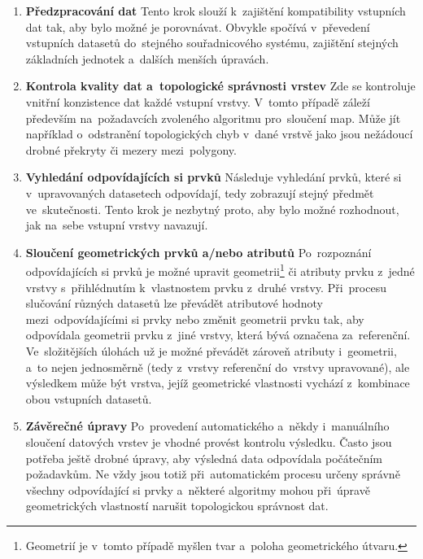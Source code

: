 \begin{enumerate}
  \item \textbf{Předzpracování dat}
    \subitem Tento krok slouží k~zajištění kompatibility vstupních dat tak, 
      aby bylo možné je porovnávat. Obvykle spočívá v~převedení vstupních 
      datasetů do~stejného souřadnico\-vé\-ho systému, zajištění stejných 
      základních jednotek a~dalších menších úpravách. 
  \item \textbf{Kontrola kvality dat a~topologické správnosti vrstev}
    \subitem Zde se kontroluje vnitřní konzistence dat každé vstupní vrstvy.
      V~tomto případě záleží především na~požadavcích zvoleného algoritmu 
      pro~sloučení map. Může jít na\-pří\-klad o~odstranění topologických chyb 
      v~dané vrstvě jako jsou nežádoucí drobné překryty či mezery 
      mezi~polygony.
  \item \textbf{Vyhledání odpovídajících si prvků}
      \subitem Následuje vyhledání prvků, které si v~upravovaných datasetech
      odpovídají, tedy zobrazují stejný předmět ve~skutečnosti. Tento krok je 
      nezbytný proto, aby bylo možné rozhodnout, jak na~sebe vstupní vrstvy 
      navazují.
  \item \textbf{Sloučení geometrických prvků a/nebo atributů}
      \subitem Po~rozpoznání odpovídajících si prvků je možné upravit 
      geometrii\footnote{Geometrií je v~tomto případě myšlen tvar a~poloha 
      geometrického útvaru.} či atributy prvku z~jedné vrstvy s~přihlédnutím 
      k~vlastnostem prvku z~druhé vrstvy. Při~procesu slučování různých datasetů 
      lze převádět atributové hodnoty mezi~odpo\-vídajícími si prvky nebo změnit  
      geometrii prvku tak, aby odpovídala geometrii prvku z~jiné vrstvy, která 
      bývá označena za~referenční. Ve~slo\-ži\-tějších úlohách už je možné převádět 
      zároveň atributy i~geometrii, a~to nejen jednosměrně (tedy z~vrstvy referenční 
      do~vrstvy upravované), ale výsledkem může být vrstva, jejíž geometrické
      vlastnosti vychází z~kombinace obou vstupních datasetů.
  \item \textbf{Závěrečné úpravy}
      \subitem Po~provedení automatického a~někdy i~manuálního sloučení datových
      vrstev je vhodné provést kontrolu výsledku. Často jsou potřeba ještě drobné
      úpravy, aby výsledná data odpovídala počátečním požadavkům. Ne vždy jsou 
      totiž při~automatickém procesu určeny správně všechny odpovídající si prvky
      a~některé algoritmy mohou při~úpravě geometrických vlastností narušit 
      topologickou správnost dat.
\end{enumerate}
